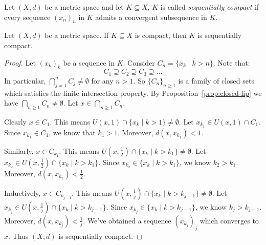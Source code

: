     \begin{definition}
        Let $(X,d)$ be a metric space and let $K \subseteq X$, $K$ is called \textit{sequentially compact} if every sequence $(x_n)_n$ in $K$ admits a convergent subsequence in $K$.
    \end{definition}

    \begin{proposition}\label{prop:compact-implies-seq-comp}
        Let $(X,d)$ be a metric space. If $K \subseteq X$ is compact, then $K$ is sequentially compact.
    \end{proposition}
        \begin{proof}
            Let $(x_k)_k$ be a sequence in $K$. Consider $C_n = \overline{\{x_k \mid k > n\}}$. Note that:
                \begin{equation*}
                    C_1 \supseteq C_2 \supseteq C_3 \supseteq...
                \end{equation*}
            In particular, $\bigcap_{j = 1}^n C_j \neq \emptyset$ for any $n > 1$. So $\{C_n\}_{n \geq 1}$ is a family of closed sets which satisfies the finite intersection property. By Proposition~\ref{prop:closed-fip} we have $\bigcap_{n \geq 1}C_n \neq \emptyset$. Let $x \in \bigcap_{n \geq 1}C_n$. 
            
            Clearly $x \in C_1$. This means $U(x,1)\cap \{x_k \mid k >1 \} \neq \emptyset$. Let $x_{k_1} \in U(x,1) \cap C_1$. Since $x_{k_1} \in C_1$, we know that $k_1 > 1$. Moreover, $d(x,x_{k_1}) < 1$. 
            
            Similarly, $x \in C_{k_1}$. This means $U(x,\frac{1}{2}) \cap \{x_k \mid k > k_1\} \neq \emptyset$. Let $x_{k_2} \in U(x,\frac{1}{2}) \cap \{x_k \mid k > k_1\}$. Since $x_{k_2} \in\{x_k \mid k > k_1\}$, we know $k_2 > k_1$. Moreover, $d(x,x_{k_2}) < \frac{1}{2}$. 
            
            Inductively, $x \in C_{k_{j-1}}$. This means $U(x,\frac{1}{j}) \cap \{x_k \mid k > k_{j - 1}\} \neq \emptyset$. Let $x_{k_j} \in U(x,\frac{1}{j}) \cap \{x_k \mid k > k_{j - 1}\}$. Since $x_{k_j} \in \{x_k \mid k > k_{j - 1}\}$, we know $k_j > k_{j-1}$. Moreover, $d(x,x_{k_j}) < \frac{1}{j}$. We've obtained a sequence $(x_{k_j})_j$ which converges to $x$. Thus $(X,d)$ is sequentially compact.
        \end{proof}

